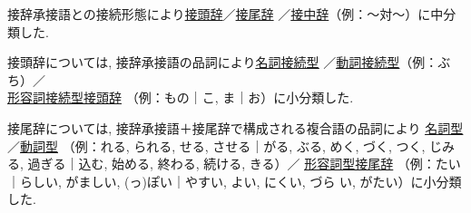接辞承接語との接続形態により\underline{接頭辞}／\underline{接尾辞}
／\underline{接中辞}（例：〜対〜）に中分類した. 

 接頭辞については, 接辞承接語の品詞により\underline{\underline{名詞接続型}}
／\underline{\underline{動詞接続型}}（例：ぶち）／\\
\underline{\underline{形容詞接続型接頭辞}}
（例：もの｜こ, ま｜お）に小分類した. 

 接尾辞については, 接辞承接語＋接尾辞で構成される複合語の品詞により
\underline{\underline{名詞型}}／\underline{\underline{動詞型}}
（例：れる, られる, せる, させる｜がる, ぶる, めく, づく, 
つく, じみる, 過ぎる｜込む, 始める, 終わる, 続ける, きる）／
\underline{\underline{形容詞型接尾辞}}
（例：たい｜らしい, がましい, (っ)ぽい｜やすい, よい, にくい, づら
い, がたい）に小分類した. 

